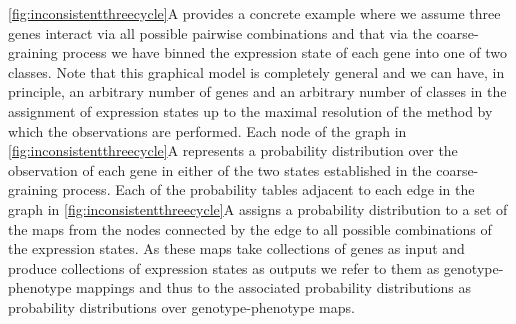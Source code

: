\ref{fig:inconsistentthreecycle}A provides a concrete example where we assume three genes interact via all possible pairwise combinations and that via the coarse-graining process we have binned the expression state of each gene into one of two classes. Note that this graphical model is completely general and we can have, in principle, an arbitrary number of genes and an arbitrary number of classes in the assignment of expression states up to the maximal resolution of the method by which the observations are performed. Each node of the graph in \ref{fig:inconsistentthreecycle}A represents a probability distribution over the observation of each gene in either of the two states established in the coarse-graining process.%
Each of the probability tables adjacent to each edge in the graph in \ref{fig:inconsistentthreecycle}A assigns a probability distribution to a set of the maps from the nodes connected by the edge to all possible combinations of the expression states. As these maps take collections of genes as input and produce collections of expression states as outputs we refer to them as genotype-phenotype mappings and thus to the associated probability distributions as probability distributions over genotype-phenotype maps.

